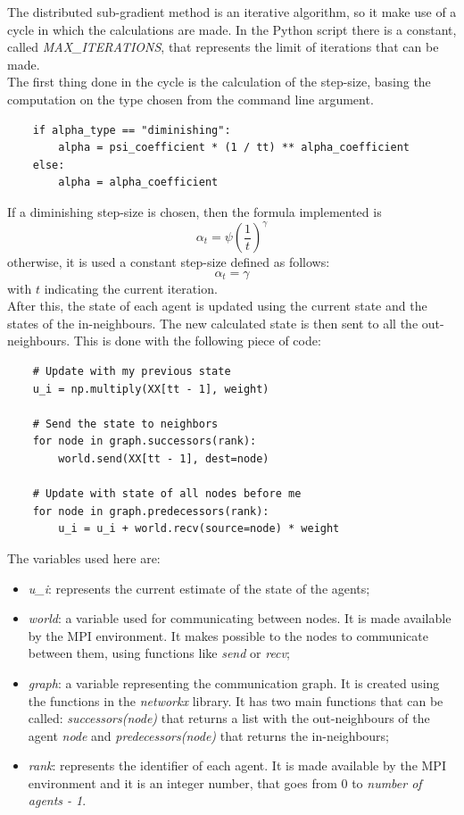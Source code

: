 \documentclass[a4paper,11pt,oneside]{book}
\begin{document}
The distributed sub-gradient method is an iterative algorithm, so it make use of a cycle in which the calculations are made. In the Python script there is a constant, called \textit{MAX\_ITERATIONS}, that represents the limit of iterations that can be made. \\
The first thing done in the cycle is the calculation of the step-size, basing the computation on the type chosen from the command line argument.

\begin{lstlisting}
    if alpha_type == "diminishing":
        alpha = psi_coefficient * (1 / tt) ** alpha_coefficient
    else:
        alpha = alpha_coefficient
\end{lstlisting}
If a diminishing step-size is chosen, then the formula implemented is
\begin{equation}
	\alpha_t = \psi \left( \dfrac{1}{t} \right)^\gamma
\end{equation}
otherwise, it is used a constant step-size defined as follows:
\begin{equation}
	\alpha_t = \gamma
\end{equation}
with $t$ indicating the current iteration. \\

After this, the state of each agent is updated using the current state and the states of the in-neighbours. The new calculated state is then sent to all the out-neighbours. This is done with the following piece of code:
\begin{lstlisting}
    # Update with my previous state
    u_i = np.multiply(XX[tt - 1], weight)

    # Send the state to neighbors
    for node in graph.successors(rank):
        world.send(XX[tt - 1], dest=node)

    # Update with state of all nodes before me
    for node in graph.predecessors(rank):
        u_i = u_i + world.recv(source=node) * weight
\end{lstlisting}

The variables used here are:
\begin{itemize}
	\item  \textit{u\_i}: represents the current estimate of the state of the agents;
	\item \textit{world}: a variable used for communicating between nodes. It is made available by the MPI environment. It makes possible to the nodes to communicate between them, using functions like \textit{send} or \textit{recv};
	\item \textit{graph}: a variable representing the communication graph. It is created using the functions in the \textit{networkx} library. It has two main functions that can be called: \textit{successors(node)} that returns a list with the out-neighbours of the agent \textit{node} and \textit{predecessors(node)} that returns the in-neighbours;
	\item \textit{rank}: represents the identifier of each agent. It is made available by the MPI environment and it is an integer number, that goes from $0$ to \textit{number of agents - 1}.
\end{itemize}
\end{document}
